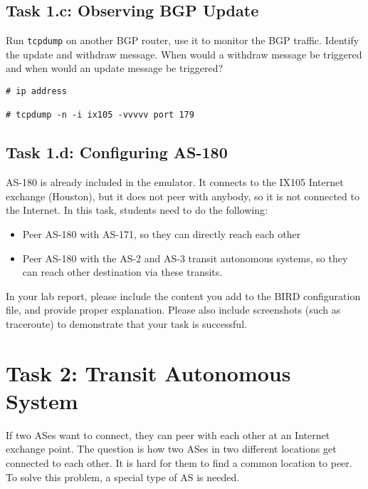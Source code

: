 \subsection{Task 1.c: Observing BGP Update} 

Run \texttt{tcpdump} on another BGP router, use it to monitor the BGP traffic.
Identify the update and withdraw message. When would a withdraw message be 
triggered and when would an update message be triggered? 

\begin{lstlisting}
# ip address

# tcpdump -n -i ix105 -vvvvv port 179
\end{lstlisting}
 
\subsection{Task 1.d: Configuring AS-180} 

AS-180 is already included in the emulator. It connects to the
IX105 Internet exchange (Houston), but it does not peer with anybody, 
so it is not connected to the Internet. 
In this task, students need to do the following:

\begin{itemize}[noitemsep]
  \item Peer AS-180 with AS-171, so they can directly reach each other
  \item Peer AS-180 with the AS-2 and AS-3 transit autonomous systems, so they can
    reach other destination via these transits.
\end{itemize}


In your lab report, please include the content you add to the 
BIRD configuration file, and provide proper explanation.
Please also include screenshots (such as traceroute) to demonstrate 
that your task is successful. 


\section{Task 2: Transit Autonomous System} 

If two ASes want to connect, they can peer with each other
at an Internet exchange point. The question is how two ASes in two different locations
get connected to each other. It is hard for them
to find a common location to peer. To solve this problem,
a special type of AS is needed.

